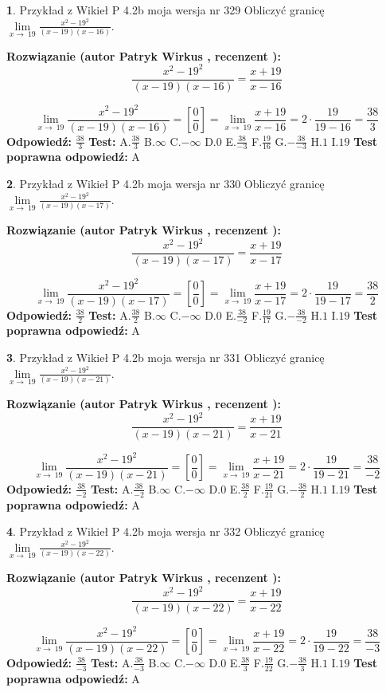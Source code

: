 \documentclass[12pt, a4paper]{article}
\theoremstyle{definition} %
\newtheorem{zad}{}
\newcommand{\zadStart}[1]{\begin{zad}#1\newline}
\newcommand{\zadStop}{\end{zad}}
\newcommand{\rozwStart}[2]{\noindent \textbf{Rozwiązanie (autor #1 , recenzent #2): }\newline}
\newcommand{\rozwStop}{\newline}
\newcommand{\odpStart}{\noindent \textbf{Odpowiedź:}\newline}
\newcommand{\odpStop}{\newline}
\newcommand{\testStart}{\noindent \textbf{Test:}\newline}
\newcommand{\testStop}{\newline}
\newcommand{\kluczStart}{\noindent \textbf{Test poprawna odpowiedź:}\newline}
\newcommand{\kluczStop}{\newline}
\begin{document}
\zadStart{Przykład z Wikieł P 4.2b moja wersja nr 329}
Obliczyć granicę $\lim\limits_{x\to\ 19}\frac{x^{2}-19^{2}}{(x-19)(x-16)}$.
\zadStop
\rozwStart{Patryk Wirkus}{}
$$\frac{x^{2}-19^{2}}{(x-19)(x-16)}=\frac{x+19}{x-16}$$

$$\lim\limits_{x\to\ 19}\frac{x^{2}-19^{2}}{(x-19)(x-16)}=[\frac{0}{0}]=\lim\limits_{x\to\ 19}\frac{x+19}{x-16}=2 \cdot \frac{19}{19-16} = \frac{38}{3}$$
\rozwStop
\odpStart
$\frac{38}{3}$
\odpStop
\testStart
A.$\frac{38}{3}$
B.$\infty$
C.$-\infty$
D.$0$
E.$\frac{38}{-3}$
F.$\frac{19}{16}$
G.$-\frac{38}{-3}$
H.$1$
I.$19$
\testStop
\kluczStart
A
\kluczStop



\zadStart{Przykład z Wikieł P 4.2b moja wersja nr 330}
Obliczyć granicę $\lim\limits_{x\to\ 19}\frac{x^{2}-19^{2}}{(x-19)(x-17)}$.
\zadStop
\rozwStart{Patryk Wirkus}{}
$$\frac{x^{2}-19^{2}}{(x-19)(x-17)}=\frac{x+19}{x-17}$$

$$\lim\limits_{x\to\ 19}\frac{x^{2}-19^{2}}{(x-19)(x-17)}=[\frac{0}{0}]=\lim\limits_{x\to\ 19}\frac{x+19}{x-17}=2 \cdot \frac{19}{19-17} = \frac{38}{2}$$
\rozwStop
\odpStart
$\frac{38}{2}$
\odpStop
\testStart
A.$\frac{38}{2}$
B.$\infty$
C.$-\infty$
D.$0$
E.$\frac{38}{-2}$
F.$\frac{19}{17}$
G.$-\frac{38}{-2}$
H.$1$
I.$19$
\testStop
\kluczStart
A
\kluczStop



\zadStart{Przykład z Wikieł P 4.2b moja wersja nr 331}
Obliczyć granicę $\lim\limits_{x\to\ 19}\frac{x^{2}-19^{2}}{(x-19)(x-21)}$.
\zadStop
\rozwStart{Patryk Wirkus}{}
$$\frac{x^{2}-19^{2}}{(x-19)(x-21)}=\frac{x+19}{x-21}$$

$$\lim\limits_{x\to\ 19}\frac{x^{2}-19^{2}}{(x-19)(x-21)}=[\frac{0}{0}]=\lim\limits_{x\to\ 19}\frac{x+19}{x-21}=2 \cdot \frac{19}{19-21} = \frac{38}{-2}$$
\rozwStop
\odpStart
$\frac{38}{-2}$
\odpStop
\testStart
A.$\frac{38}{-2}$
B.$\infty$
C.$-\infty$
D.$0$
E.$\frac{38}{2}$
F.$\frac{19}{21}$
G.$-\frac{38}{2}$
H.$1$
I.$19$
\testStop
\kluczStart
A
\kluczStop



\zadStart{Przykład z Wikieł P 4.2b moja wersja nr 332}
Obliczyć granicę $\lim\limits_{x\to\ 19}\frac{x^{2}-19^{2}}{(x-19)(x-22)}$.
\zadStop
\rozwStart{Patryk Wirkus}{}
$$\frac{x^{2}-19^{2}}{(x-19)(x-22)}=\frac{x+19}{x-22}$$

$$\lim\limits_{x\to\ 19}\frac{x^{2}-19^{2}}{(x-19)(x-22)}=[\frac{0}{0}]=\lim\limits_{x\to\ 19}\frac{x+19}{x-22}=2 \cdot \frac{19}{19-22} = \frac{38}{-3}$$
\rozwStop
\odpStart
$\frac{38}{-3}$
\odpStop
\testStart
A.$\frac{38}{-3}$
B.$\infty$
C.$-\infty$
D.$0$
E.$\frac{38}{3}$
F.$\frac{19}{22}$
G.$-\frac{38}{3}$
H.$1$
I.$19$
\testStop
\kluczStart
A
\kluczStop
\end{document}
